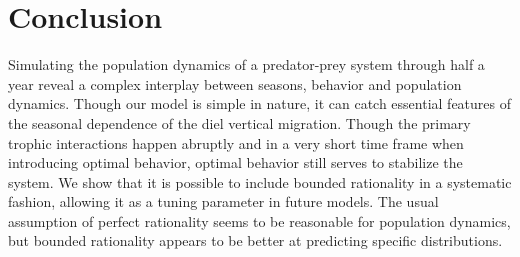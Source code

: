 \section{Conclusion} %
Simulating the population dynamics of a predator-prey system through half a year reveal a complex interplay between seasons, behavior and population dynamics. Though our model is simple in nature, it can catch essential features of the seasonal dependence of the diel vertical migration. Though the primary trophic interactions happen abruptly and in a very short time frame when introducing optimal behavior, optimal behavior still serves to stabilize the system.
We show that it is possible to include bounded rationality in a systematic fashion, allowing it as a tuning parameter in future models. The usual assumption of perfect rationality seems to be reasonable for population dynamics, but bounded rationality appears to be better at predicting specific distributions.

